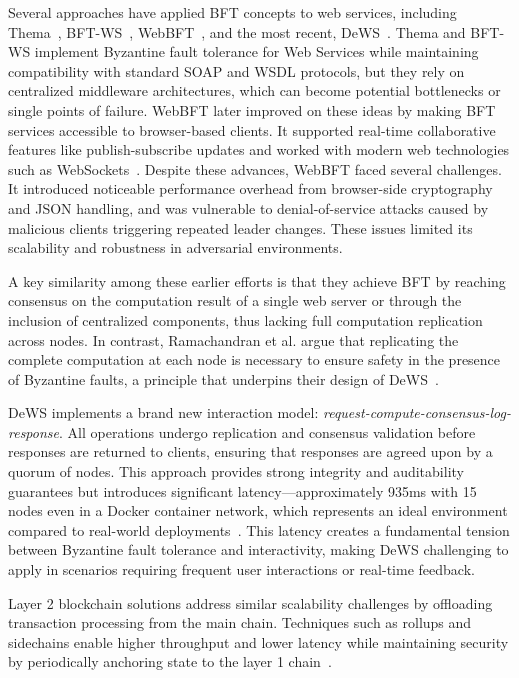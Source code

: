 \documentclass[conference]{IEEEtran}
\begin{document}
Several approaches have applied BFT concepts to web services, including Thema~\cite{merideth_thema_2005}, BFT-WS~\cite{zhao_bft-ws_2007}, WebBFT~\cite{berger_webbft_2018}, and the most recent, DeWS~\cite{ramachandran_dews_2023}. Thema and BFT-WS implement Byzantine fault tolerance for Web Services while maintaining compatibility with standard SOAP and WSDL protocols, but they rely on centralized middleware architectures, which can become potential bottlenecks or single points of failure. WebBFT later improved on these ideas by making BFT services accessible to browser-based clients. It supported real-time collaborative features like publish-subscribe updates and worked with modern web technologies such as WebSockets~\cite{berger_webbft_2018}. Despite these advances, WebBFT faced several challenges. It introduced noticeable performance overhead from browser-side cryptography and JSON handling, and was vulnerable to denial-of-service attacks caused by malicious clients triggering repeated leader changes. These issues limited its scalability and robustness in adversarial environments.

A key similarity among these earlier efforts is that they achieve BFT by reaching consensus on the computation result of a single web server or through the inclusion of centralized components, thus lacking full computation replication across nodes. In contrast, Ramachandran et al. argue that replicating the complete computation at each node is necessary to ensure safety in the presence of Byzantine faults, a principle that underpins their design of DeWS~\cite{ramachandran_dews_2023}.

DeWS implements a brand new interaction model: \textit{request-compute-consensus-log-response}. All operations undergo replication and consensus validation before responses are returned to clients, ensuring that responses are agreed upon by a quorum of nodes. This approach provides strong integrity and auditability guarantees but introduces significant latency—approximately 935ms with 15 nodes even in a Docker container network, which represents an ideal environment compared to real-world deployments~\cite{ramachandran_dews_2023}. This latency creates a fundamental tension between Byzantine fault tolerance and interactivity, making DeWS challenging to apply in scenarios requiring frequent user interactions or real-time feedback.

Layer 2 blockchain solutions address similar scalability challenges by offloading transaction processing from the main chain. Techniques such as rollups and sidechains enable higher throughput and lower latency while maintaining security by periodically anchoring state to the layer 1 chain~\cite{mandal_investigating_2023, thibault_blockchain_2022}.
\end{document}

